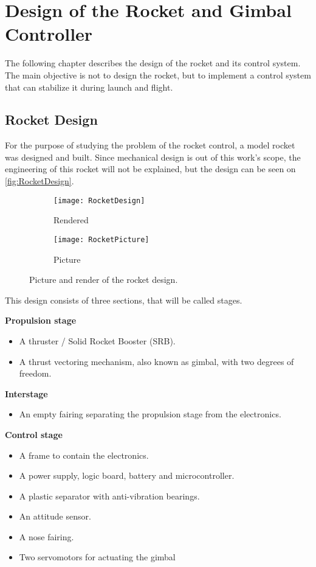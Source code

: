 
\chapter{Design of the Rocket and Gimbal Controller}
\graphicspath{{figures/rocket/Design/}}
The following chapter describes the design of the rocket and its control system. The main objective is not to design the rocket, but to implement a control system that can stabilize it during launch and flight. 

\section{Rocket Design}
For the purpose of studying the problem of the rocket control, a model rocket was designed and built. Since mechanical design is out of this work's scope, the engineering of this rocket will not be explained, but the design can be seen on \autoref{fig:RocketDesign}.
\begin{figure}[htbp]
\centering
\begin{subfigure}{0.45\textwidth}
\texttt{[image: RocketDesign]}
\caption{Rendered}
\label{fig:RocketRender}
\end{subfigure}
\begin{subfigure}{0.45\textwidth}
\texttt{[image: RocketPicture]}
\caption{Picture}
\label{fig:RocketPicture}
\end{subfigure}
\caption{Picture and render of the rocket design.}
\label{fig:RocketDesign}
\end{figure}

This design consists of three sections, that will be called stages.

\textbf{Propulsion stage}
\begin{itemize}[noitemsep]
	\item {A thruster / Solid Rocket Booster (SRB).}
	\item {A thrust vectoring mechanism, also known as gimbal, with two degrees of freedom.}
\end{itemize}

\textbf{Interstage}
\begin{itemize}[noitemsep]
	\item {An empty fairing separating the propulsion stage from the electronics.}
\end{itemize}
\textbf{Control stage}
\begin{itemize}[noitemsep]
	\item A frame to contain the electronics.
	\item A power supply, logic board, battery and microcontroller.
	\item A plastic separator with anti-vibration bearings.
	\item An attitude sensor.
	\item A nose fairing.
	\item {Two servomotors for actuating the gimbal}
\end{itemize}

